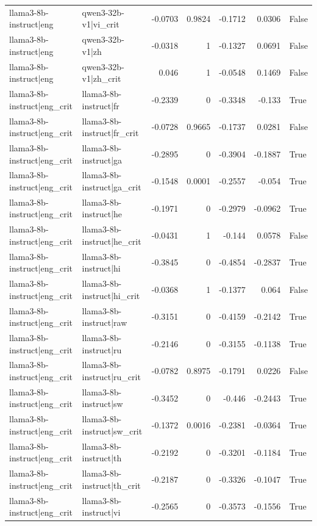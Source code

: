 \begin{table}
\begin{tabular}{l l r r r r l}
llama3-8b-instruct|eng & qwen3-32b-v1|vi_crit & -0.0703 & 0.9824 & -0.1712 & 0.0306 & False \\
llama3-8b-instruct|eng & qwen3-32b-v1|zh & -0.0318 & 1 & -0.1327 & 0.0691 & False \\
llama3-8b-instruct|eng & qwen3-32b-v1|zh_crit & 0.046 & 1 & -0.0548 & 0.1469 & False \\
llama3-8b-instruct|eng_crit & llama3-8b-instruct|fr & -0.2339 & 0 & -0.3348 & -0.133 & True \\
llama3-8b-instruct|eng_crit & llama3-8b-instruct|fr_crit & -0.0728 & 0.9665 & -0.1737 & 0.0281 & False \\
llama3-8b-instruct|eng_crit & llama3-8b-instruct|ga & -0.2895 & 0 & -0.3904 & -0.1887 & True \\
llama3-8b-instruct|eng_crit & llama3-8b-instruct|ga_crit & -0.1548 & 0.0001 & -0.2557 & -0.054 & True \\
llama3-8b-instruct|eng_crit & llama3-8b-instruct|he & -0.1971 & 0 & -0.2979 & -0.0962 & True \\
llama3-8b-instruct|eng_crit & llama3-8b-instruct|he_crit & -0.0431 & 1 & -0.144 & 0.0578 & False \\
llama3-8b-instruct|eng_crit & llama3-8b-instruct|hi & -0.3845 & 0 & -0.4854 & -0.2837 & True \\
llama3-8b-instruct|eng_crit & llama3-8b-instruct|hi_crit & -0.0368 & 1 & -0.1377 & 0.064 & False \\
llama3-8b-instruct|eng_crit & llama3-8b-instruct|raw & -0.3151 & 0 & -0.4159 & -0.2142 & True \\
llama3-8b-instruct|eng_crit & llama3-8b-instruct|ru & -0.2146 & 0 & -0.3155 & -0.1138 & True \\
llama3-8b-instruct|eng_crit & llama3-8b-instruct|ru_crit & -0.0782 & 0.8975 & -0.1791 & 0.0226 & False \\
llama3-8b-instruct|eng_crit & llama3-8b-instruct|sw & -0.3452 & 0 & -0.446 & -0.2443 & True \\
llama3-8b-instruct|eng_crit & llama3-8b-instruct|sw_crit & -0.1372 & 0.0016 & -0.2381 & -0.0364 & True \\
llama3-8b-instruct|eng_crit & llama3-8b-instruct|th & -0.2192 & 0 & -0.3201 & -0.1184 & True \\
llama3-8b-instruct|eng_crit & llama3-8b-instruct|th_crit & -0.2187 & 0 & -0.3326 & -0.1047 & True \\
llama3-8b-instruct|eng_crit & llama3-8b-instruct|vi & -0.2565 & 0 & -0.3573 & -0.1556 & True \\

\end{tabular}
\end{table}
